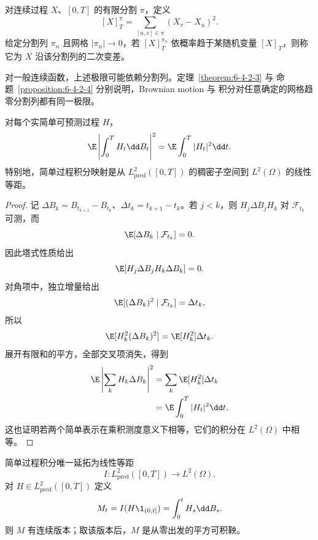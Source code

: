 \begin{definition}[二次变差]\label{def:6-4-2-3}
对连续过程 $X$、$[0,T]$ 的有限分割 $\pi$，定义
\[
 [X]^{\pi}_T=\sum_{[u,v]\in\pi}(X_v-X_u)^2.
\]
给定分割列 $\pi_n$ 且网格 $|\pi_n|\to0$，若
$[X]^{\pi_n}_T$ 依概率趋于某随机变量 $[X]_T$，则称它为 $X$ 沿该分割列的二次变差。
\end{definition}

对一般连续函数，上述极限可能依赖分割列。定理~\ref{theorem:6-4-2-3} 与
命题~\ref{proposition:6-4-2-4} 分别说明，Brownian motion 与 \Ito{} 积分对任意确定的网格趋零分割列都有同一极限。

\begin{theorem}[\Ito{} 等距]\label{theorem:6-4-2-1}
对每个实简单可预测过程 $H$，
\[
 \E\left|\int_0^TH_t\dd B_t\right|^2
 =\E\int_0^T|H_t|^2\dd t.
\]
特别地，简单过程积分映射是从 $L^2_{\mathrm{pred}}([0,T])$ 的稠密子空间到
$L^2(\Omega)$ 的线性等距。
\end{theorem}

\begin{proof}
记 $\Delta B_k=B_{t_{k+1}}-B_{t_k}$、$\Delta t_k=t_{k+1}-t_k$。若 $j<k$，则
$H_j\Delta B_jH_k$ 对 $\mathcal F_{t_k}$ 可测，而
\[
 \E[\Delta B_k\mid\mathcal F_{t_k}]=0.
\]
因此塔式性质给出
\[
 \E[H_j\Delta B_jH_k\Delta B_k]=0.
\]
对角项中，独立增量给出
\[
 \E[(\Delta B_k)^2\mid\mathcal F_{t_k}]=\Delta t_k,
\]
所以
\[
 \E[H_k^2(\Delta B_k)^2]=\E[H_k^2]\Delta t_k.
\]
展开有限和的平方，全部交叉项消失，得到
\begin{align*}
 \E\left|\sum_kH_k\Delta B_k\right|^2
 &=\sum_k\E[H_k^2]\Delta t_k\\
 &=\E\int_0^T|H_t|^2\dd t.
\end{align*}
这也证明若两个简单表示在乘积测度意义下相等，它们的积分在 $L^2(\Omega)$ 中相等。
\end{proof}

\begin{theorem}\label{theorem:6-4-2-2}
简单过程积分唯一延拓为线性等距
\[
 I:L^2_{\mathrm{pred}}([0,T])\longrightarrow L^2(\Omega).
\]
对 $H\in L^2_{\mathrm{pred}}([0,T])$ 定义
\[
 M_t=I(H\1_{(0,t]})=\int_0^tH_s\dd B_s.
\]
则 $M$ 有连续版本；取该版本后，$M$ 是从零出发的平方可积鞅。
\end{theorem}

